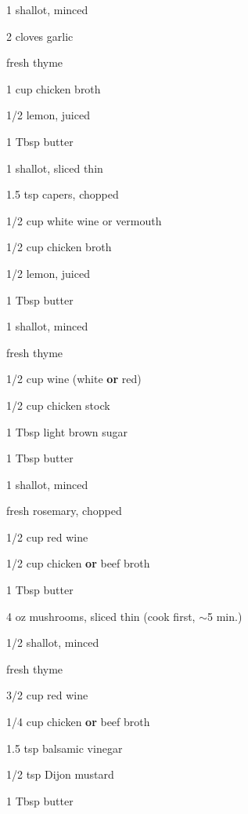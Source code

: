\documentclass[oneside]{book}  %
\newcommand{\itemNL}{\item[] \hspace{-\labelsep}}  %
\newcommand{\about}{$\sim$}
\begin{document}
\begin{twocols}
  \begin{ingredients}
    \item[1] shallot, minced
    \item[2] cloves garlic
    \itemNL fresh thyme
    \item[1 cup] chicken broth
    \item[1/2] lemon, juiced
    \item[1 Tbsp] butter
  \end{ingredients}

  \begin{ingredients}
    \item[1] shallot, sliced thin
    \item[1.5 tsp] capers, chopped
    \item[1/2 cup] white wine or vermouth
    \item[1/2 cup] chicken broth
    \item[1/2] lemon, juiced
    \item[1 Tbsp] butter
  \end{ingredients}

  \begin{ingredients}
    \item[1] shallot, minced
    \itemNL fresh thyme
    \item[1/2 cup] wine (white \textbf{or} red)
    \item[1/2 cup] chicken stock
    \item[1 Tbsp] light brown sugar
    \item[1 Tbsp] butter
  \end{ingredients}

  \columnbreak

  \begin{ingredients}
    \item[1] shallot, minced
    \itemNL fresh rosemary, chopped
    \item[1/2 cup] red wine
    \item[1/2 cup] chicken \textbf{or} beef broth
    \item[1 Tbsp] butter
  \end{ingredients}

  \begin{ingredients}
    \item[4 oz] mushrooms, sliced thin (cook first, \about 5 min.)
    \item[1/2] shallot, minced
    \itemNL fresh thyme
    \item[3/2 cup] red wine
    \item[1/4 cup] chicken \textbf{or} beef broth
    \item[1.5 tsp] balsamic vinegar
    \item[1/2 tsp] Dijon mustard
    \item[1 Tbsp] butter
  \end{ingredients}


\end{twocols}
\end{document}
